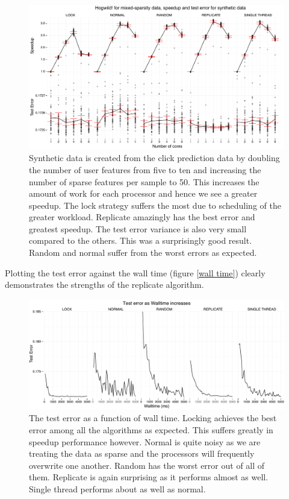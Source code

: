\documentclass{article} %
\begin{document}
\begin{figure}[htb]
\centering
\includegraphics[width=\textwidth]{../../speedup_errors_complete_syn.pdf}
\caption{Synthetic data is created from the click prediction data by doubling the number of user features from five to ten and increasing the number of sparse features per sample to 50. This increases the amount of work for each processor and hence we see a greater speedup. The lock strategy suffers the most due to scheduling of the greater workload. Replicate amazingly has the best error and greatest speedup. The test error variance is also very small compared to the others. This was a surprisingly good result. Random and normal suffer from the worst errors as expected.}
\label{speedup_syn}
\end{figure}

Plotting the test error against the wall time (figure \ref{wall time}) clearly demonstrates the strengths of the replicate algorithm.

\begin{figure}[htb]
\centering
\includegraphics[width=\textwidth]{../../walltime_6.pdf}
\caption{The test error as a function of wall time. Locking achieves the best error among all the algorithms as expected. This suffers greatly in speedup performance however. Normal is quite noisy as we are treating the data as sparse and the processors will frequently overwrite one another. Random has the worst error out of all of them. Replicate is again surprising as it performs almost as well. Single thread performs about as well as normal.}
\label{walltime}
\end{figure}
\end{document}
